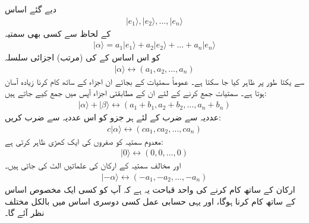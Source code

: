 دیے گئے اساس 
\begin{align}
	|e_1\rangle, |e_2\rangle, \dots, |e_n\rangle
\end{align}
کے لحاظ سے کسی  بھی سمتیہ
\begin{align}
	|\alpha\rangle=a_1|e_1\rangle+a_2|e_2\rangle+\dots+a_n|e_n\rangle
\end{align}
کو اس اساس  کے   کی  (مرتب)   اجزائی سلسلہ 
\begin{align}
	|\alpha\rangle\leftrightarrow(a_1, a_2, \dots, a_n)
\end{align}
سے یکتا طور پر ظاہر کیا جا سکتا ہے۔ عموماً  سمتیات کے بجائے  ان  اجزاء کے ساتھ کام کرنا زیادہ آسان  ہوتا ہے۔  سمتیات  جمع کرنے کے لئے  ان کے مطابقتی اجزاء آپس میں جمع کیے جاتے ہیں:
\begin{align}
	|\alpha\rangle+|\beta\rangle\leftrightarrow(a_1+b_1, a_2+b_2, \dots, a_n+b_n)
\end{align}
عددیہ سے ضرب  کے لئے ہر جزو کو اس عددیہ  سے  ضرب کریں:
\begin{align}
	c|\alpha\rangle\leftrightarrow(ca_1, ca_2, \dots, ca_n)
\end{align}
معدوم سمتیہ کو صفروں کی ایک کھڑی ظاہر کرتی ہے:
\begin{align}
	|0\rangle\leftrightarrow(0, 0, \dots, 0)
\end{align}
اور مخالف سمتیہ کے ارکان کی علماتیں  الٹ کی جاتی ہیں۔
\begin{align}
	|-\alpha\rangle\leftrightarrow(-a_1, -a_2, \dots, -a_n)
\end{align}
ارکان کے ساتھ کام کرنے کی واحد  قباحت  یہ ہے کہ  آپ کو کسی ایک مخصوص اساس کے ساتھ کام کرنا ہوگا،  اور یہی  حسابی عمل کسی دوسری  اساس میں بالکل مختلف نظر آئے گا۔

